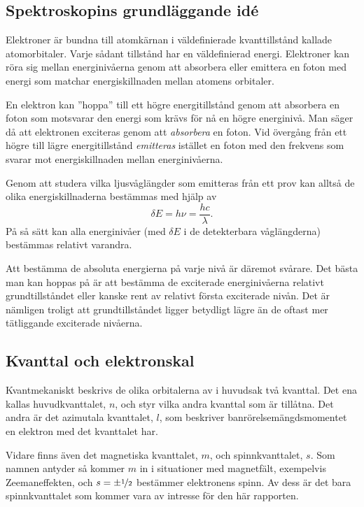 \documentclass[11pt,a4paper]{article}
\begin{document}
\subsection{Spektroskopins grundläggande idé}
Elektroner är bundna till atomkärnan i väldefinierade kvanttillstånd
kallade atomorbitaler. Varje sådant tillstånd har en väldefinierad
energi. Elektroner kan röra sig mellan energinivåerna genom att
absorbera eller emittera en foton med energi som matchar 
energiskillnaden mellan atomens orbitaler. 

En elektron kan ''hoppa'' till ett högre energitillstånd genom att
absorbera en foton som motsvarar den energi som krävs för nå en högre
energinivå. Man säger då att elektronen exciteras genom att
\emph{absorbera} en foton. Vid övergång från ett högre till lägre
energitillstånd \emph{emitteras} istället en foton med den frekvens
som svarar mot energiskillnaden mellan energinivåerna. 
 
 
Genom att studera vilka ljusvåglängder som emitteras från ett prov
kan alltså de olika energiskillnaderna bestämmas med hjälp av  
\[\delta E = h\nu=\frac{hc}{\lambda}.\]
På så sätt kan alla energinivåer (med $\delta E$ i de detekterbara
våglängderna) bestämmas relativt varandra. 

Att bestämma de absoluta
energierna på varje nivå är däremot svårare. Det bästa man kan hoppas
på är att bestämma de exciterade energinivåerna relativt
grundtillståndet eller kanske rent av relativt första exciterade
nivån. Det är nämligen troligt att grundtillståndet ligger betydligt
lägre än de oftast mer tätliggande exciterade nivåerna. 

\subsection{Kvanttal och elektronskal}
Kvantmekaniskt beskrivs de olika orbitalerna av i huvudsak två
kvanttal. Det ena kallas huvudkvanttalet, $n$, och styr vilka andra
kvanttal som är tillåtna. Det andra är det azimutala kvanttalet, $l$,
som beskriver banrörelsemängdsmomentet en elektron med det kvanttalet
har. 

Vidare finns även det magnetiska kvanttalet, $m$, och spinnkvanttalet,
$s$. Som namnen antyder så kommer $m$ in i situationer med magnetfält,
exempelvis Zeemaneffekten, och $s=\pm\nicefrac{1}{2}$ bestämmer
elektronens spinn. 
Av dess är det bara spinnkvanttalet som kommer vara av intresse för
den här rapporten.  
\end{document}
